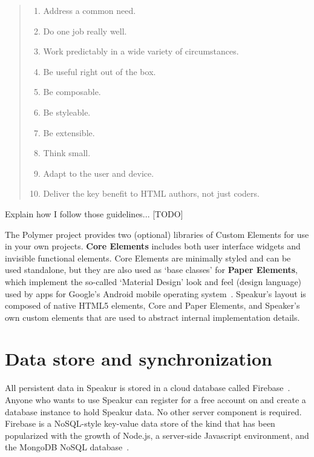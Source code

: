 \begin{quote}
\begin{enumerate}
\item Address a common need.\label{wcp:commonneed}
\item Do one job really well.\label{wcp:onejob}
\item Work predictably in a wide variety of circumstances.\label{wcp:predicatable}
\item Be useful right out of the box.\label{wcp:useful}
\item Be composable.\label{wcp:composable}
\item Be styleable.\label{wcp:stylable}
\item Be extensible.\label{wcp:extensible}
\item Think small.\label{wcp:thinksmall}
\item Adapt to the user and device.\label{wcp:adaptable}
\item Deliver the key benefit to HTML authors, not just coders.\label{wcp:htmlauthors}
~\cite{webcomponentscontributors2014}
\end{enumerate}
\end{quote}

Explain how I follow those guidelines... [TODO]

The Polymer project provides two (optional) libraries of Custom Elements for use in your own projects. 
\textbf{Core Elements} includes both user interface
widgets and invisible functional elements.
Core Elements are minimally styled and can be used standalone, 
but they are also used as `base classes' for 
\textbf{Paper Elements}, 
which implement the so-called `Material Design' look and feel (design language) used by apps for Google's Android mobile operating system~\cite{imura2015}.
Speakur's layout is composed of native HTML5 elements, 
Core and Paper Elements, 
and Speaker's own custom elements that are used to abstract internal implementation details.

\section{Data store and synchronization}
All persistent data in Speakur is stored in a cloud database called Firebase~\cite{firebasecontributors2015}.
Anyone who wants to use Speakur can register for a free account on  and create a database instance to hold Speakur data.
No other server component is required.
Firebase is a NoSQL-style key-value data store of the kind that has been popularized
with the growth of 
Node.js, a server-side Javascript environment,
and the MongoDB NoSQL database~\cite{dickey2014}.

